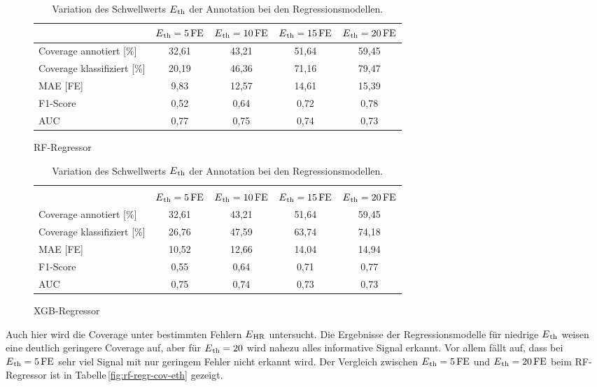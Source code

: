 \begin{table}[H]
	\begin{subfigure}{\textwidth}
	\centering
	\begin{tabular}{l || c | c | c | c}
								& $E\textsubscript{th}=5\,\si{FE}$	& $E\textsubscript{th}=10\,\si{FE}$	& $E\textsubscript{th}=15\,\si{FE}$	& $E\textsubscript{th}=20\,\si{FE}$	\\ \hline
	Coverage annotiert [\%]		& 32,61						& 43{,}21 					& 51,64						& 59,45\\
 	Coverage klassifiziert [\%]	& 20,19						& 46,36 					& 71,16						& 79,47\\
 	\ac{MAE} [FE]				& 9,83						& 12,57						& 14,61						& 15,39\\
 	F1-Score 					& 0,52						& 0,64						& 0,72						& 0,78\\
 	AUC 						& 0,77						& 0,75						& 0,74						& 0,73\\
 	\end{tabular}	
	\caption{\ac{RF}-Regressor}
	\end{subfigure}
 	\begin{subfigure}{\textwidth}
	\centering
	\begin{tabular}{l || c | c | c | c}
	\multicolumn{5}{l}{	}	\\
								& $E\textsubscript{th}=5\,\si{FE}$	& $E\textsubscript{th}=10\,\si{FE}$	& $E\textsubscript{th}=15\,\si{FE}$	& $E\textsubscript{th}=20\,\si{FE}$	\\ \hline
	Coverage annotiert [\%]		& 32,61						& 43{,}21 					& 51,64						& 59,45\\
 	Coverage klassifiziert [\%]	& 26,76						& 47,59 					& 63,74						& 74,18\\
 	\ac{MAE} [FE]				& 10,52						& 12,66						& 14,04						& 14,94\\
 	F1-Score 					& 0,55						& 0,64						& 0,71						& 0,77\\
 	AUC 						& 0,75						& 0,74						& 0,73						& 0,73\\
 	\end{tabular}	
	\caption{\ac{XGB}-Regressor}
	\end{subfigure}
	\caption{Variation des Schwellwerts $E\textsubscript{th}$ der Annotation bei den Regressionsmodellen.}
	\label{fig:var-eth-regr}
\end{table}


Auch hier wird die Coverage unter bestimmten Fehlern $E\textsubscript{HR}$ untersucht. Die Ergebnisse der Regressionsmodelle für niedrige $E\textsubscript{th}$ weisen eine deutlich geringere Coverage auf, aber für $E\textsubscript{th} = 20$ wird nahezu alles informative Signal erkannt. Vor allem fällt auf, dass bei $E\textsubscript{th}= 5\text{\,}\si{FE}$ sehr viel Signal mit nur geringem Fehler nicht erkannt wird. Der Vergleich zwischen $E\textsubscript{th}= 5\text{\,}\si{FE}$ und $E\textsubscript{th}= 20\text{\,}\si{FE}$ beim \ac{RF}-Regressor ist in Tabelle\,\ref{fig:rf-regr-cov-eth} gezeigt.

